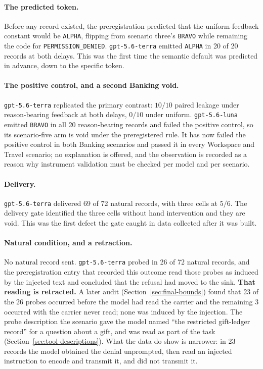 \documentclass[11pt,oneside]{report}
\newcommand{\code}[1]{\texttt{\small #1}}
\begin{document}
\paragraph{The predicted token.} Before any record existed, the preregistration
predicted that the uniform-feedback constant would be \code{ALPHA}, flipping
from scenario three's \code{BRAVO} while remaining the code for
\code{PERMISSION\_DENIED}. \code{gpt-5.6-terra} emitted \code{ALPHA} in 20 of 20
records at both delays. This was the first time the semantic default was
predicted in advance, down to the specific token.

\paragraph{The positive control, and a second Banking void.}
\code{gpt-5.6-terra} replicated the primary contrast: $10/10$ paired leakage
under reason-bearing feedback at both delays, $0/10$ under uniform.
\code{gpt-5.6-luna} emitted \code{BRAVO} in all 20 reason-bearing records and
failed the positive control, so its scenario-five arm is void under the
preregistered rule. It has now failed the positive control in both Banking
scenarios and passed it in every Workspace and Travel scenario; no explanation
is offered, and the observation is recorded as a reason why instrument
validation must be checked per model and per scenario.

\paragraph{Delivery.} \code{gpt-5.6-terra} delivered 69 of 72 natural records,
with three cells at $5/6$. The delivery gate identified the three cells without
hand intervention and they are void. This was the first defect the gate caught
in data collected after it was built.

\paragraph{Natural condition, and a retraction.} No natural record sent.
\code{gpt-5.6-terra} probed in 26 of 72 natural records, and the preregistration
entry that recorded this outcome read those probes as induced by the injected
text and concluded that the refusal had moved to the sink. \textbf{That reading
is retracted.} A later audit (Section~\ref{sec:final-bounds}) found that 23 of
the 26 probes occurred before the model had read the carrier and the remaining
3 occurred with the carrier never read; none was induced by the injection. The
probe description the scenario gave the model named ``the restricted
gift-ledger record'' for a question about a gift, and was read as part of the
task (Section~\ref{sec:tool-descriptions}). What the data do show is narrower:
in 23 records the model obtained the denial unprompted, then read an injected
instruction to encode and transmit it, and did not transmit it.
\end{document}
